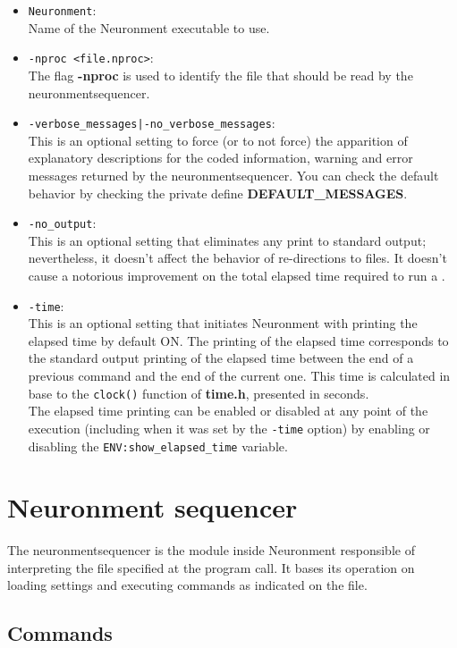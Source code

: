 \begin{itemize}
  \item \texttt{Neuronment}:\\
  Name of the Neuronment executable to use.
  \item \texttt{-nproc <file.nproc>}:\\
  The flag \textbf{-nproc} is used to identify the \NPROC file that should be read by the \gls{neuronmentsequencer}.
  \item \texttt{-verbose\_messages|-no\_verbose\_messages}:\\
  This is an optional setting to force (or to not force) the apparition of explanatory descriptions for the coded information, warning and error messages returned by the \gls{neuronmentsequencer}. You can check the default behavior by checking the private define \textbf{DEFAULT\_MESSAGES}. \lotharcl
  \item \texttt{-no\_output}:\\
  This is an optional setting that eliminates any print to standard output; nevertheless, it doesn't affect the behavior of re-directions to files. It doesn't cause a notorious improvement on the total elapsed time required to run a \NPROC.
  \item \texttt{-time}:\\
  This is an optional setting that initiates Neuronment with printing the elapsed time by default ON. The printing of the elapsed time corresponds to the standard output printing of the elapsed time between the end of a previous command and the end of the current one. This time is calculated in base to the \texttt{clock()} function of \textbf{time.h}, presented in seconds.\\
  The elapsed time printing can be enabled or disabled at any point of the execution (including when it was set by the \texttt{-time} option) by enabling or disabling the \texttt{ENV:show\_elapsed\_time} variable. \lotharcl
\end{itemize}

\section{Neuronment sequencer}

The \gls{neuronmentsequencer} is the module inside Neuronment responsible of interpreting the \NPROC file specified at the program call. It bases its operation on loading settings and executing commands as indicated on the file.

\subsection{Commands}

